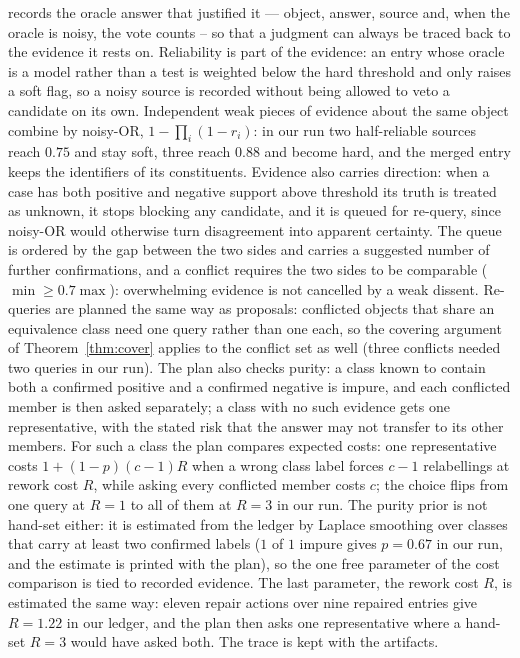\documentclass[11pt]{article}
\begin{document}
records the oracle answer that justified it --- object, answer, source and, when the oracle is
noisy, the vote counts -- so that a judgment can always be traced back to the evidence it rests on. Reliability is part of
the evidence: an entry whose oracle is a model rather than a test is weighted below the hard
threshold and only raises a soft flag, so a noisy source is recorded without being allowed to veto
a candidate on its own. Independent weak pieces of evidence about the same object combine by
noisy-OR, $1-\prod_i(1-r_i)$: in our run two half-reliable sources reach $0.75$ and stay soft,
three reach $0.88$ and become hard, and the merged entry keeps the identifiers of its constituents. Evidence also carries direction:
when a case has both positive and negative support above threshold its truth is treated as unknown,
it stops blocking any candidate, and it is queued for re-query, since noisy-OR would otherwise turn
disagreement into apparent certainty. The queue is ordered by the gap between the two sides and
carries a suggested number of further confirmations, and a conflict requires the two sides to be
comparable ($\min \ge 0.7\max$): overwhelming evidence is not cancelled by a weak dissent. Re-queries are planned the same way as
proposals: conflicted objects that share an equivalence class need one query rather than one each,
so the covering argument of Theorem~\ref{thm:cover} applies to the conflict set as well (three
conflicts needed two queries in our run). The plan also checks purity: a class known to contain both
a confirmed positive and a confirmed negative is impure, and each conflicted member is then asked
separately; a class with no such evidence gets one representative, with the stated risk that the
answer may not transfer to its other members. For such a class the plan compares expected costs:
one representative costs $1+(1-p)(c-1)R$ when a wrong class label forces $c-1$ relabellings at
rework cost $R$, while asking every conflicted member costs $c$; the choice flips from one query at
$R=1$ to all of them at $R=3$ in our run. The purity prior is not hand-set either: it is estimated
from the ledger by Laplace smoothing over classes that carry at least two confirmed labels ($1$ of
$1$ impure gives $p=0.67$ in our run, and the estimate is printed with the plan), so the one free
parameter of the cost comparison is tied to recorded evidence. The last parameter, the rework cost
$R$, is estimated the same way: eleven repair actions over nine repaired entries give $R=1.22$ in
our ledger, and the plan then asks one representative where a hand-set $R=3$ would have asked both. The trace is kept with the artifacts.
\end{document}
